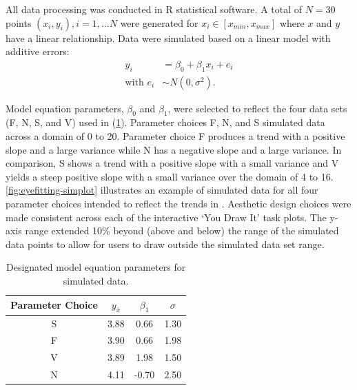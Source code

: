 \documentclass[12pt]{article}
\begin{document}
All data processing was conducted in R statistical software. A total of
\(N = 30\) points \((x_i, y_i), i = 1,...N\) were generated for
\(x_i \in [x_{min}, x_{max}]\) where \(x\) and \(y\) have a linear
relationship. Data were simulated based on a linear model with additive
errors: \begin{align}
y_i & = \beta_0 + \beta_1 x_i + e_i \\
\text{with } e_i & \sim N(0, \sigma^2). \nonumber
\end{align}

Model equation parameters, \(\beta_0\) and \(\beta_1\), were selected to
reflect the four data sets (F, N, S, and V) used in
\citet{mosteller1981eye} (\cref{tab:eyefitting-parameters}). Parameter
choices F, N, and S simulated data across a domain of 0 to 20. Parameter
choice F produces a trend with a positive slope and a large variance
while N has a negative slope and a large variance. In comparison, S
shows a trend with a positive slope with a small variance and V yields a
steep positive slope with a small variance over the domain of 4 to 16.
\cref{fig:eyefitting-simplot} illustrates an example of simulated data
for all four parameter choices intended to reflect the trends in
\citet{mosteller1981eye}. Aesthetic design choices were made consistent
across each of the interactive `You Draw It' task plots. The y-axis
range extended 10\% beyond (above and below) the range of the simulated
data points to allow for users to draw outside the simulated data set
range.

\begin{table}

\caption{\label{tab:eyefitting-parameters}Designated model equation parameters for simulated data.}
\centering
\begin{tabular}[t]{cccc}
\toprule
Parameter Choice & $y_{\bar{x}}$ & $\beta_1$ & $\sigma$\\
\midrule
S & 3.88 & 0.66 & 1.30\\
F & 3.90 & 0.66 & 1.98\\
V & 3.89 & 1.98 & 1.50\\
N & 4.11 & -0.70 & 2.50\\
\bottomrule
\end{tabular}
\end{table}
\end{document}
